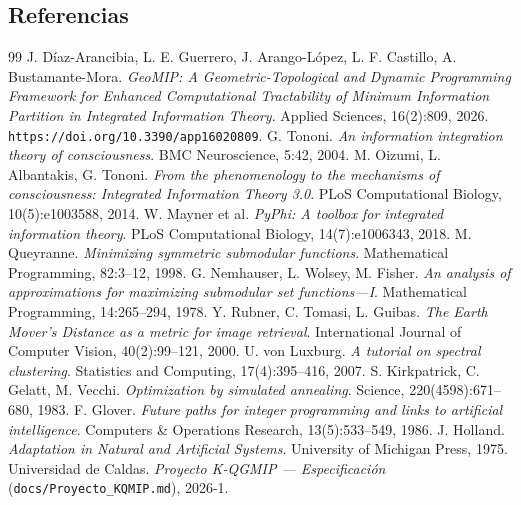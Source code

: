 \documentclass[11pt,letterpaper]{article}
\begin{document}
\subsection{Referencias}
\begin{thebibliography}{99}
	 J. Díaz-Arancibia, L. E. Guerrero, J. Arango-López,
		L. F. Castillo, A. Bustamante-Mora. \emph{GeoMIP: A Geometric-Topological and
		Dynamic Programming Framework for Enhanced Computational Tractability of Minimum
		Information Partition in Integrated Information Theory}. Applied Sciences,
		16(2):809, 2026. \texttt{https://doi.org/10.3390/app16020809}.
	 G. Tononi. \emph{An information integration theory of
		consciousness}. BMC Neuroscience, 5:42, 2004.
	 M. Oizumi, L. Albantakis, G. Tononi. \emph{From the phenomenology
		to the mechanisms of consciousness: Integrated Information Theory 3.0}. PLoS
	Computational Biology, 10(5):e1003588, 2014.
	 W. Mayner et al. \emph{PyPhi: A toolbox for integrated information
		theory}. PLoS Computational Biology, 14(7):e1006343, 2018.
	 M. Queyranne. \emph{Minimizing symmetric submodular
		functions}. Mathematical Programming, 82:3--12, 1998.
	 G. Nemhauser, L. Wolsey, M. Fisher. \emph{An analysis of
		approximations for maximizing submodular set functions---I}. Mathematical
	Programming, 14:265--294, 1978.
	 Y. Rubner, C. Tomasi, L. Guibas. \emph{The Earth Mover's Distance
		as a metric for image retrieval}. International Journal of Computer Vision,
	40(2):99--121, 2000.
	 U. von Luxburg. \emph{A tutorial on spectral clustering}.
	Statistics and Computing, 17(4):395--416, 2007.
	 S. Kirkpatrick, C. Gelatt, M. Vecchi. \emph{Optimization by
		simulated annealing}. Science, 220(4598):671--680, 1983.
	 F. Glover. \emph{Future paths for integer programming and links to
		artificial intelligence}. Computers \& Operations Research, 13(5):533--549, 1986.
	 J. Holland. \emph{Adaptation in Natural and Artificial Systems}.
	University of Michigan Press, 1975.
	 Universidad de Caldas. \emph{Proyecto K-QGMIP — Especificación}
	(\texttt{docs/Proyecto\_KQMIP.md}), 2026-1.
\end{thebibliography}
\end{document}
